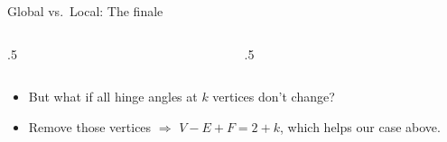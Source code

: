 \documentclass[english,t]{beamer}
\begin{document}
\begin{frame}{Global vs.~Local: The finale} \label{arm lemma wrong 4}
    \begin{columns}
        \begin{column}{.5\textwidth}
        \vspace{-5pt}

        \end{column}
        
        \begin{column}{.5\textwidth}
        \end{column}
    \end{columns}
    \vspace{35pt}
    \begin{center}
    \end{center}
    \begin{itemize}
        \item<5-> But what if all hinge angles at $k$ vertices don't change? 
        \item[]<6-> Remove those vertices $\Rightarrow$ $V-E+F =2 +k$, which helps our case above. 
    \end{itemize}
\end{frame}
\end{document}
